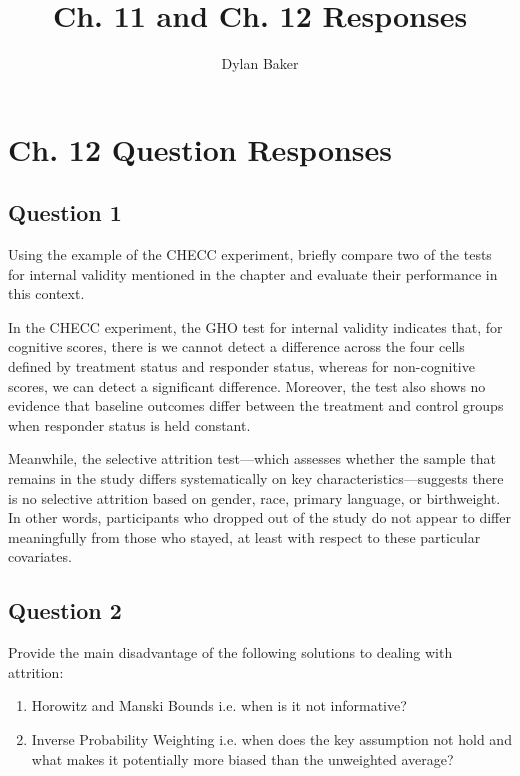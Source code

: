 \documentclass[10pt]{article}
\title{Ch. 11 and Ch. 12 Responses}
\author{Dylan Baker}
\begin{document}
\maketitle

\tableofcontents

\section{Ch. 12 Question Responses}

\subsection{Question 1}

Using the example of the CHECC experiment, briefly compare two of the tests for internal validity mentioned in the chapter and evaluate their performance in this context.

\hrulefill\hspace{0.5em}\dotfill\hspace{0.5em}\hrulefill

In the CHECC experiment, the GHO test for internal validity 
indicates that, for cognitive scores, there is 
we cannot detect a difference across the four cells defined 
by treatment status and responder status, 
whereas for non-cognitive scores, 
we can detect a significant difference. 
Moreover, the test also shows no evidence that baseline 
outcomes differ between the treatment and control groups 
when responder status is held constant.

Meanwhile, the selective attrition test—which assesses 
whether the sample that remains in the study differs 
systematically on key characteristics—suggests there 
is no selective attrition based on gender, race, 
primary language, or birthweight. In other words, 
participants who dropped out of the study do not 
appear to differ meaningfully from those who stayed,
at least with respect to these particular covariates.


\subsection{Question 2}
Provide the main disadvantage of the following solutions to dealing with attrition:

\begin{enumerate}
    \item Horowitz and Manski Bounds i.e. when is it not informative?
    \item Inverse Probability Weighting i.e. when does the key assumption not hold and what makes it potentially more biased than the unweighted average?
\end{enumerate}
\end{document}
